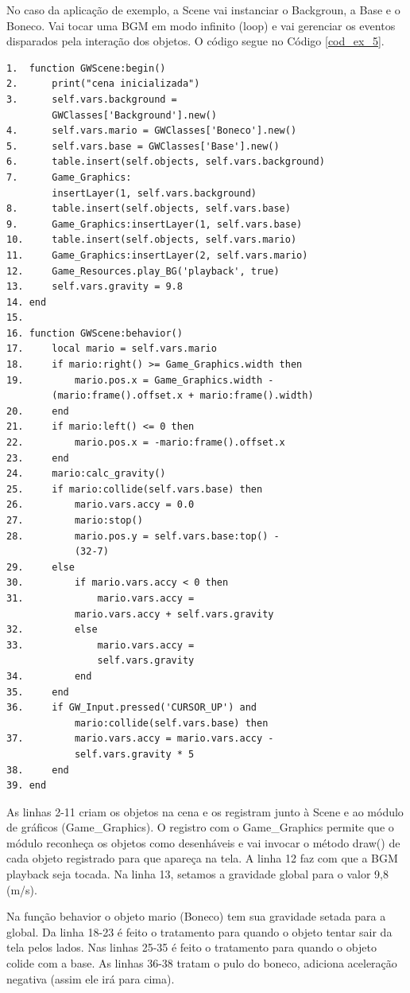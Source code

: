 \documentclass[
	12pt,				%
	openright,			%
	oneside,			%
	a4paper,			%
	brazil,				%
	]{abntex2}
\begin{document}
No caso da aplicação de exemplo, a Scene vai instanciar o Backgroun, a Base e o Boneco. Vai tocar uma BGM em modo infinito (loop) e vai gerenciar os eventos disparados pela interação dos objetos. O código segue no Código \ref{cod_ex_5}.

\begin{lstlisting}[caption={Código da Cena},label=cod_ex_5,frame=single]
1.	function GWScene:begin()
2.		print("cena inicializada")
3.		self.vars.background = 
		GWClasses['Background'].new()
4.		self.vars.mario = GWClasses['Boneco'].new()
5.		self.vars.base = GWClasses['Base'].new()
6.		table.insert(self.objects, self.vars.background)
7.		Game_Graphics:
		insertLayer(1, self.vars.background)
8.		table.insert(self.objects, self.vars.base)
9.		Game_Graphics:insertLayer(1, self.vars.base)
10.		table.insert(self.objects, self.vars.mario)
11.		Game_Graphics:insertLayer(2, self.vars.mario)
12.		Game_Resources.play_BG('playback', true)
13.		self.vars.gravity = 9.8
14.	end
15.
16.	function GWScene:behavior()
17.		local mario = self.vars.mario 
18.		if mario:right() >= Game_Graphics.width then
19.			mario.pos.x = Game_Graphics.width - 
		(mario:frame().offset.x + mario:frame().width) 
20.		end
21.		if mario:left() <= 0 then
22.			mario.pos.x = -mario:frame().offset.x 
23.		end
24.		mario:calc_gravity()
25.		if mario:collide(self.vars.base) then
26.			mario.vars.accy = 0.0
27.			mario:stop()
28.			mario.pos.y = self.vars.base:top() - 
			(32-7)
29.		else 
30.			if mario.vars.accy < 0 then
31.				mario.vars.accy = 
			mario.vars.accy + self.vars.gravity
32.			else
33.				mario.vars.accy = 
				self.vars.gravity
34.			end
35.		end
36.		if GW_Input.pressed('CURSOR_UP') and 
			mario:collide(self.vars.base) then
37.			mario.vars.accy = mario.vars.accy - 
			self.vars.gravity * 5
38.		end
39.	end
\end{lstlisting}

As linhas 2-11 criam os objetos na cena e os registram junto à Scene e ao módulo de gráficos (Game\_Graphics). O registro com o Game\_Graphics permite que o módulo reconheça os objetos como desenháveis e vai invocar o método draw() de cada objeto registrado para que apareça na tela. A linha 12 faz com que a BGM playback seja tocada. Na linha 13, setamos a gravidade global para o valor 9,8 (m/s).

Na função behavior o objeto mario (Boneco) tem sua gravidade setada para a global. Da linha 18-23 é feito o tratamento para quando o objeto tentar sair da tela pelos lados. Nas linhas 25-35 é feito o tratamento para quando o objeto colide com a base. As linhas 36-38 tratam o pulo do boneco, adiciona aceleração negativa (assim ele irá para cima).
\end{document}
